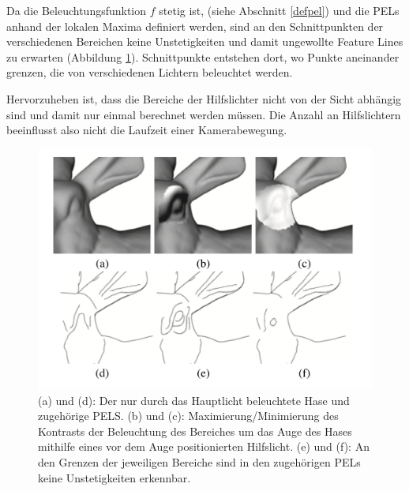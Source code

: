 \documentclass{paperStyle}
\begin{document}
Da die Beleuchtungsfunktion $f$ stetig ist, (siehe Abschnitt \ref{defpel}) und die PELs anhand der lokalen Maxima definiert werden,
sind an den Schnittpunkten der verschiedenen Bereichen keine Unstetigkeiten und damit ungewollte Feature Lines zu erwarten (Abbildung \ref{fig:rabbit}). Schnittpunkte entstehen dort, wo Punkte aneinander grenzen, die von verschiedenen Lichtern beleuchtet werden. 

Hervorzuheben ist, dass die Bereiche der Hilfslichter nicht von der Sicht abhängig sind und damit nur einmal berechnet werden müssen. Die Anzahl an Hilfslichtern beeinflusst also  nicht die Laufzeit einer Kamerabewegung.
\begin{figure}
	\centering
		\includegraphics[width=0.7\linewidth]{rabbit.png}
	\caption{(a) und (d): Der nur durch das Hauptlicht beleuchtete Hase und zugehörige PELS. (b) und (c): Maximierung/Minimierung des Kontrasts der Beleuchtung des Bereiches um das Auge des Hases mithilfe eines vor dem Auge positionierten Hilfslicht. (e) und (f): An den Grenzen der jeweiligen Bereiche sind in den zugehörigen PELs keine Unstetigkeiten erkennbar.}
	\label{fig:rabbit}
\end{figure}
\label{beleuchtung}
\end{document}
